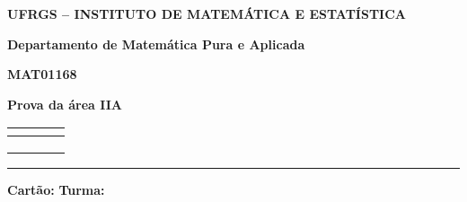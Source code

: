 \documentclass[10pt,a4paper]{article}%
\begin{document}
\noindent
\begin{minipage}[l]{11.4cm}

     {\bf UFRGS -- INSTITUTO DE MATEMÁTICA E ESTATÍSTICA}

    {\bf Departamento de Matemática Pura e Aplicada}
  
   {\bf MAT01168}

    {\bf Prova da área IIA}
\end{minipage}\hfill\begin{minipage}{5.75cm}
    \begin{tabular}{|c|c|c|c|}  \hline
        {\bf } & {\bf }& {\bf }&   {\bf }\!\! \\
        \hline
         \hline \hspace{1cm} & \hspace{1cm}   & \hspace{1cm}  & \hspace{1cm} \\
        &&& \\

        &&& \\
        \hline
    \end{tabular}
\end{minipage}

\vspace{0.2cm} \noindent \rule {\textwidth}{0.05cm}

\linespread{1.0}

\vspace{0,2cm} {\normalsize {} \underline
{\hspace{9.6cm}}\hfill {\bf Cartão:} \underline {\hspace{3.0cm}}\hfill {\bf Turma:}\underline {\hspace{8pt}\hspace{8pt}}}
\end{document}
